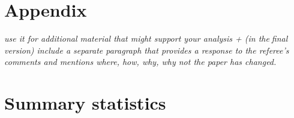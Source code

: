 \documentclass[11pt]{article}
\begin{document}
	
	
	\newpage
	
	\begin{subappendices}
		\appendix
		
		\section*{Appendix}\label{Appendix}
		\textit{use it for additional material that might support your analysis + (in thefinal version) include a separate paragraph that provides a response to the referee's comments and mentions where, how, why, why not the paper has changed.}
		\singlespacing
		\section{Summary statistics}\label{ASec:xxxxx}
		
		
	\end{subappendices}	
	
	
	
	\newpage
	{\footnotesize 
		
		\singlespacing
		
	}
	
	
\end{document}
